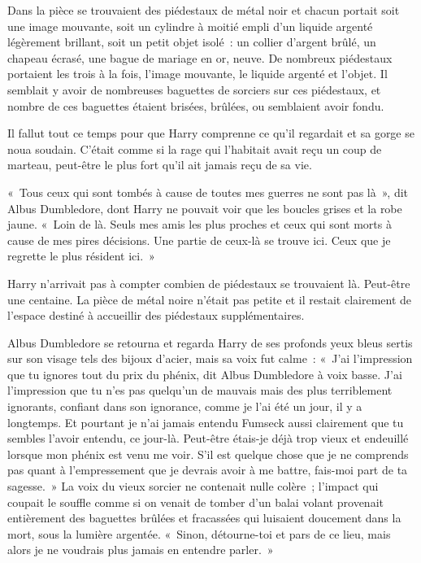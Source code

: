 Dans la pièce se trouvaient des piédestaux de métal noir et chacun portait soit une image mouvante, soit un cylindre à moitié empli d'un liquide argenté légèrement brillant, soit un petit objet isolé~: un collier d'argent brûlé, un chapeau écrasé, une bague de mariage en or, neuve.
De nombreux piédestaux portaient les trois à la fois, l'image mouvante, le liquide argenté et l'objet.
Il semblait y avoir de nombreuses baguettes de sorciers sur ces piédestaux, et nombre de ces baguettes étaient brisées, brûlées, ou semblaient avoir fondu.

Il fallut tout ce temps pour que Harry comprenne ce qu'il regardait et sa gorge se noua soudain.
C'était comme si la rage qui l'habitait avait reçu un coup de marteau, peut-être le plus fort qu'il ait jamais reçu de sa vie.

«~Tous ceux qui sont tombés à cause de toutes mes guerres ne sont pas là~», dit Albus Dumbledore, dont Harry ne pouvait voir que les boucles grises et la robe jaune.
«~Loin de là.
Seuls mes amis les plus proches et ceux qui sont morts à cause de mes pires décisions.
Une partie de ceux-là se trouve ici.
Ceux que je regrette le plus résident ici.~»

Harry n'arrivait pas à compter combien de piédestaux se trouvaient là.
Peut-être une centaine.
La pièce de métal noire n'était pas petite et il restait clairement de l'espace destiné à accueillir des piédestaux supplémentaires.

Albus Dumbledore se retourna et regarda Harry de ses profonds yeux bleus sertis sur son visage tels des bijoux d'acier, mais sa voix fut calme~: «~J'ai l'impression que tu ignores tout du prix du phénix, dit Albus Dumbledore à voix basse.
J'ai l'impression que tu n'es pas quelqu'un de mauvais mais des plus terriblement ignorants, confiant dans son ignorance, comme je l'ai été un jour, il y a longtemps.
Et pourtant je n'ai jamais entendu Fumseck aussi clairement que tu sembles l'avoir entendu, ce jour-là.
Peut-être étais-je déjà trop vieux et endeuillé lorsque mon phénix est venu me voir.
S'il est quelque chose que je ne comprends pas quant à l'empressement que je devrais avoir à me battre, fais-moi part de ta sagesse.~»
La voix du vieux sorcier ne contenait nulle colère~; l'impact qui coupait le souffle comme si on venait de tomber d'un balai volant provenait entièrement des baguettes brûlées et fracassées qui luisaient doucement dans la mort, sous la lumière argentée.
«~Sinon, détourne-toi et pars de ce lieu, mais alors je ne voudrais plus jamais en entendre parler.~»

